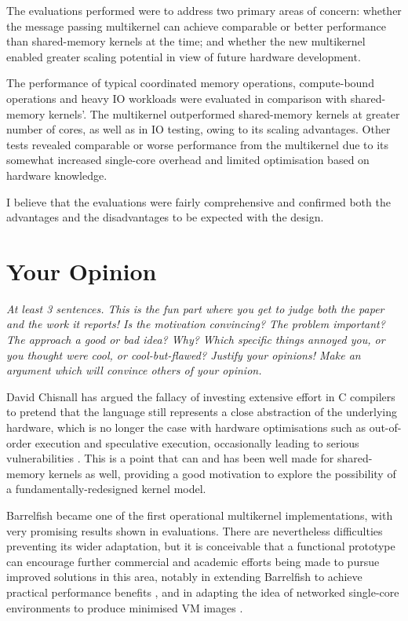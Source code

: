\documentclass[11pt]{article}
\begin{document}
The evaluations performed were to address two primary areas of concern: whether the message passing multikernel can achieve comparable or better performance than shared-memory kernels at the time; and whether the new multikernel enabled greater scaling potential in view of future hardware development. 

The performance of typical coordinated memory operations, compute-bound operations and heavy IO workloads were evaluated in comparison with shared-memory kernels'. The multikernel outperformed shared-memory kernels at greater number of cores, as well as in IO testing, owing to its scaling advantages. Other tests revealed comparable or worse performance from the multikernel due to its somewhat increased single-core overhead and limited optimisation based on hardware knowledge. 

I believe that the evaluations were fairly comprehensive and confirmed both the advantages and the disadvantages to be expected with the design.

\section*{Your Opinion}
\textsl{At least 3 sentences. This is the fun part where you get to judge both the paper and the work it reports! Is the motivation convincing? The problem important? The approach a good or bad idea?  Why? Which specific things annoyed you, or you thought were cool, or cool-but-flawed? Justify your opinions! Make an argument which will convince others of your opinion.}

David Chisnall has argued the fallacy of investing extensive effort in C compilers to pretend that the language still represents a close abstraction of the underlying hardware, which is no longer the case with hardware optimisations such as out-of-order execution and speculative execution, occasionally leading to serious vulnerabilities \cite{kocher2018spectre}. This is a point that can and has been well made for shared-memory kernels as well, providing a good motivation to explore the possibility of a fundamentally-redesigned kernel model.

Barrelfish became one of the first operational multikernel implementations, with very promising results shown in evaluations. There are nevertheless difficulties preventing its wider adaptation, but it is conceivable that a functional prototype can encourage further commercial and academic efforts being made to pursue improved solutions in this area, notably in extending Barrelfish to achieve practical performance benefits \cite{peter2016arrakis}, and in adapting the idea of networked single-core environments to produce minimised VM images \cite{madhavapeddy2013unikernels}.
\end{document}

